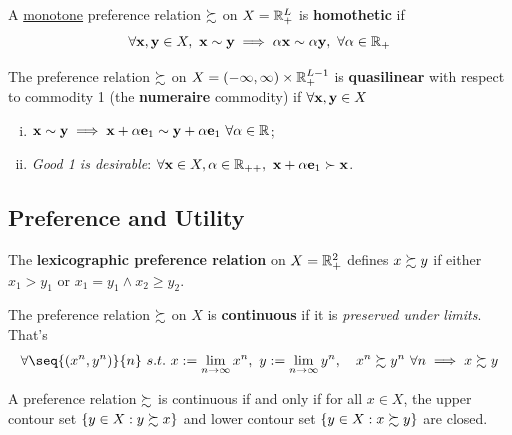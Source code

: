 \documentclass{article}
\begin{document}
 			\begin{definition}[3.B.6]
 				A \ul{monotone} preference relation $\succsim$ on $X = \mathbb{R}^L_+$ is \textbf{homothetic} if 
 				\begin{equation}
 					\forall \textbf{x}, \textbf{y} \in X,\ \textbf{x} \sim \textbf{y} \implies \alpha \textbf{x} \sim \alpha \textbf{y},\ \forall \alpha \in \mathbb{R}_+
 				\end{equation}
 			\end{definition}
 			
 			\begin{definition}[3.B.7]
 				The preference relation $\succsim$ on $X = (-\infty, \infty) \times \mathbb{R}^{L-1}_+$ is \textbf{quasilinear} with respect to commodity 1 (the \textbf{numeraire} commodity) if $\forall \textbf{x}, \textbf{y} \in X$
 				\begin{enumerate}[(i)]
 					\item $\textbf{x} \sim \textbf{y} \implies \textbf{x} + \alpha \textbf{e}_1 \sim \textbf{y} + \alpha \textbf{e}_1\ \forall \alpha \in \mathbb{R}$;
 					\item \emph{Good 1 is desirable}: $\forall \textbf{x} \in X, \alpha \in \mathbb{R}_{++},\ \textbf{x} + \alpha \textbf{e}_1 \succ \textbf{x}$.
 				\end{enumerate}
 			\end{definition}
 
 		\subsection{Preference and Utility}
 			\begin{definition}[Example 3.C.1]
 				The \textbf{lexicographic preference relation} on $X = \mathbb{R}^2_+$ defines $x \succsim y$ if either $x_1 > y_1$ or $x_1 = y_1 \land x_2 \geq y_2$.
 			\end{definition}
 			
 			\begin{definition}[3.C.1]
 				The preference relation $\succsim$ on $X$ is \textbf{continuous} if it is \emph{preserved under limits}. That's 
 				\begin{align}
 					\forall \seq{(x^n, y^n)}{n}\ s.t.\ x := \lim_{n\to \infty} x^n,\ y := \lim_{n\to\infty} y^n,\quad
 					x^n \pref y^n\ \forall n \implies x \pref y
 				\end{align}
 			\end{definition}
 			
 			\begin{proposition}
 				A preference relation $\succsim$ is continuous if and only if for all $x \in X$, the upper contour set $\{y \in X : y \succsim x\}$ and lower contour set $\{y \in X : x \succsim y\}$ are closed.
 			\end{proposition}
 			
\end{document}
